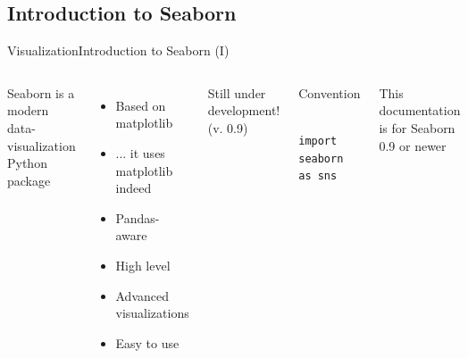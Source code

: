 \documentclass[10pt,compress]{beamer} %
\begin{document}
\subsection{Introduction to Seaborn}

\begin{frame}[fragile]{Visualization}{Introduction to Seaborn (I)}
	\begin{columns}
	Seaborn is a modern data-visualization Python package
	\begin{itemize}
		\item Based on matplotlib
		\item ... it uses matplotlib indeed
		\item Pandas-aware
		\item High level
		\item Advanced visualizations
		\item Easy to use
	\end{itemize}
	Still under development! (v. 0.9)
	\begin{block}{\footnotesize{Convention}}
	\vspace{-0.2cm} 
	\begin{lstlisting}
	import seaborn as sns
	\end{lstlisting}
	\vspace{-0.2cm} 
	\end{block}

	\begin{alertblock}{}
	\vspace{-0.2cm} 
	\footnotesize{This documentation is for Seaborn 0.9 or newer}
	\vspace{-0.2cm} 
	\end{alertblock}

	\end{columns}
\end{frame}
\end{document}
